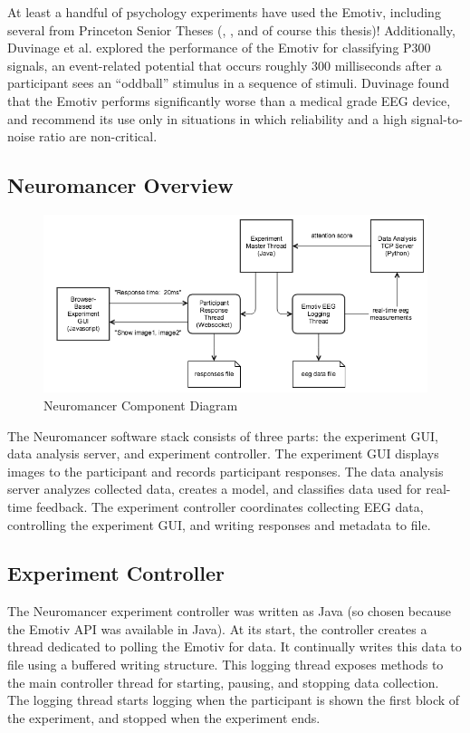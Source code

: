 \documentclass[11pt]{report}
\begin{document}
	At least a handful of psychology experiments have used the Emotiv, including several from Princeton Senior Theses (\cite{Rafidi}, \cite{Adelson}, and of course this thesis)!  Additionally, Duvinage et al.\cite{Duvinage} explored the performance of the Emotiv for classifying P300 signals, an event-related potential that occurs roughly 300 milliseconds after a participant sees an ``oddball'' stimulus in a sequence of stimuli\cite{p300}.  Duvinage found that the Emotiv performs significantly worse than a medical grade EEG device, and recommend its use only in situations in which reliability and a high signal-to-noise ratio are non-critical.
	
\subsection{Neuromancer Overview}
\begin{figure}
\includegraphics[width=12cm]{neuromancer_anatomy}
\caption{Neuromancer Component Diagram}
\end{figure}

The Neuromancer software stack consists of three parts: the experiment GUI, data analysis server, and experiment controller.  The experiment GUI displays images to the participant and records participant responses.  The data analysis server analyzes collected data, creates a model, and classifies data used for real-time feedback.  The experiment controller coordinates collecting EEG data, controlling the experiment GUI, and writing responses and metadata to file.

\subsection{Experiment Controller}
The Neuromancer experiment controller was written as Java (so chosen because the Emotiv API was available in Java).  At its start, the controller creates a thread dedicated to polling the Emotiv for data.  It continually writes this data to file using a buffered writing structure.  This logging thread exposes methods to the main controller thread for starting, pausing, and stopping data collection.  The logging thread starts logging when the participant is shown the first block of the experiment, and stopped when the experiment ends.
  
\end{document}
